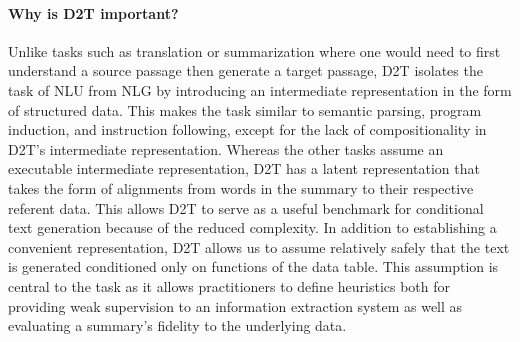 \documentclass[11pt]{article}
\begin{document}
\paragraph{Why is D2T important?}
\begin{comment}
\item Convince readers that this is a good information extraction task,
similar to semantic parsing / instruction following?
\item Highlight: Closed domain
\item TODO: probably need to rewrite this, rethink framing
\end{comment}
Unlike tasks such as translation or summarization where one would
need to first understand a source passage then generate a target passage,
D2T isolates the task of NLU from NLG by introducing an intermediate representation in
the form of structured data.
This makes the task similar to semantic parsing, program induction, and instruction following,
except for the lack of compositionality in D2T's intermediate representation.
Whereas the other tasks assume an executable intermediate representation,
D2T has a latent representation that takes the form of alignments from 
words in the summary to their respective referent data.
This allows D2T to serve as a useful benchmark for conditional text generation
because of the reduced complexity.
In addition to establishing a convenient representation,
D2T allows us to assume relatively safely that the text is generated conditioned only on
functions of the data table.
This assumption is central to the task as it allows
practitioners to define heuristics both for providing weak supervision to an
information extraction system as well as evaluating a summary's fidelity
to the underlying data.


\end{document}
